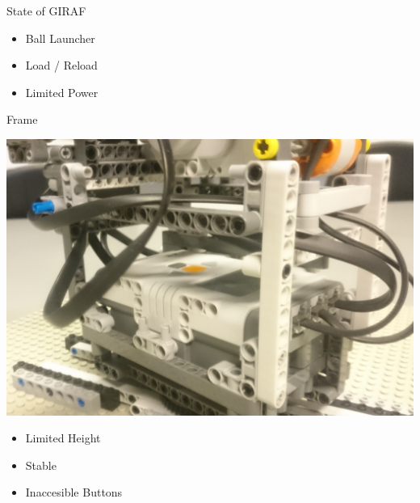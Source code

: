 \begin{frame}{State of GIRAF}

\begin{itemize}
	\item Ball Launcher
	\item Load / Reload
	\item Limited Power
\end{itemize}
\end{frame}

\begin{frame}{Frame}

\includegraphics[scale=0.08]{figures/FrameMech.JPG} 

\begin{itemize}
	\item Limited Height
	\item Stable
	\item Inaccesible Buttons
\end{itemize}
\end{frame}

